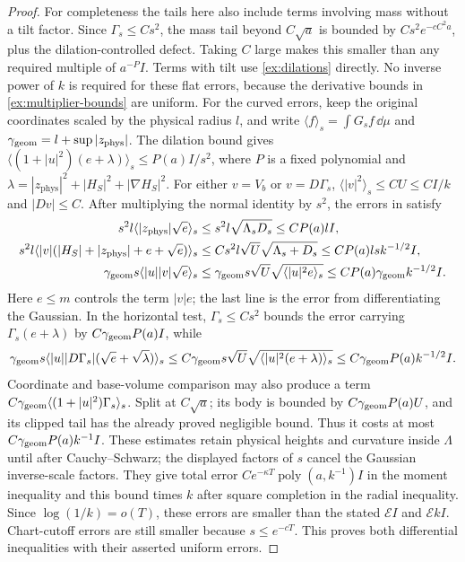 \begin{proof}
For completeness the tails here also include terms involving mass
without a tilt factor. Since \(\Gamma_s\le Cs^2\), the mass tail
beyond \(C\sqrt a\) is bounded by
\(Cs^2e^{-cC^2a}\), plus the dilation-controlled defect. Taking
\(C\) large makes this smaller than any required multiple of
\(a^{-P}I\). Terms with tilt use \eqref{ex:dilations} directly.
No inverse power of \(k\) is required for these flat errors, because
the derivative bounds in \eqref{ex:multiplier-bounds} are uniform.
For the curved errors, keep the original coordinates scaled by the
physical radius \(l\), and write \(\langle f\rangle_s=\int G_sf\,\dd\mu\)
and \(\gamma_{\rm geom}=l+\sup|z_{\mathrm{phys}}|\). The dilation bound gives
\(\langle(1+|u|^2)(e+\lambda)\rangle_s\le P(a)I/s^2\),
where \(P\) is a fixed polynomial and
\(\lambda=|z_{\mathrm{phys}}|^2+|H_S|^2+|\nabla H_S|^2\).
For either \(v=V_b\) or \(v=D\Gamma_s\),
\(\langle|v|^2\rangle_s\le CU\le CI/k\) and \(|Dv|\le C\).
After multiplying the normal identity by \(s^2\), the errors in
 satisfy
\begin{align*}
 s^2l\langle|z_{\mathrm{phys}}|\sqrt e\rangle_s
 &\le s^2l\sqrt{\Lambda_sD_s}\le CP(a)lI,\\
 s^2l\langle|v|(|H_S|+|z_{\mathrm{phys}}|+e+\sqrt e)\rangle_s
 &\le Cs^2l\sqrt U\sqrt{\Lambda_s+D_s}
       \le CP(a)ls k^{-1/2}I,\\
 \gamma_{\rm geom} s\langle|u||v|\sqrt e\rangle_s
 &\le\gamma_{\rm geom} s\sqrt U\sqrt{\langle|u|^2e\rangle_s}
       \le CP(a)\gamma_{\rm geom} k^{-1/2}I.
\end{align*}
Here \(e\le m\) controls the term \(|v|e\); the last line is
the error from differentiating the Gaussian. In the horizontal test,
\(\Gamma_s\le Cs^2\) bounds the error carrying
\(\Gamma_s(e+\lambda)\) by \(C\gamma_{\rm geom} P(a)I\), while
\[
 \gamma_{\rm geom} s\langle|u||D\Gamma_s|(\sqrt e+\sqrt\lambda)\rangle_s
 \le C\gamma_{\rm geom} s\sqrt U
             \sqrt{\langle|u|^2(e+\lambda)\rangle_s}
 \le C\gamma_{\rm geom} P(a)k^{-1/2}I.
\]
Coordinate and base-volume comparison may also produce a term
\(C\gamma_{\rm geom}\langle(1+|u|^2)\Gamma_s\rangle_s\).
Split at \(C\sqrt a\); its body is bounded by
\(C\gamma_{\rm geom} P(a)U\), and its clipped tail has the already proved
negligible bound. Thus it costs at most
\(C\gamma_{\rm geom} P(a)k^{-1}I\). These estimates retain physical heights
and curvature inside \(\Lambda\) until after Cauchy--Schwarz;
the displayed factors of \(s\) cancel the Gaussian inverse-scale
factors. They give total error
\(Ce^{-\kappa T}\operatorname{poly}(a,k^{-1})I\) in the moment
inequality and this bound times \(k\) after square completion in
the radial inequality. Since
\(\log(1/k)=o(T)\), these errors are smaller than the stated
\(\mathcal E I\) and \(\mathcal E kI\). Chart-cutoff errors are
still smaller because \(s\le e^{-cT}\). This proves both
differential inequalities with their asserted uniform errors.


\end{proof}
